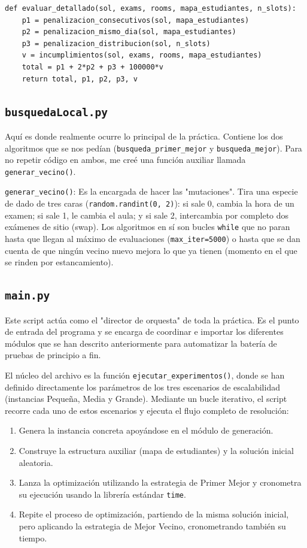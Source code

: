 \documentclass[12pt]{article}
\begin{document}
\begin{lstlisting}[caption={Función de evaluación detallada en Python}]
def evaluar_detallado(sol, exams, rooms, mapa_estudiantes, n_slots):
    p1 = penalizacion_consecutivos(sol, mapa_estudiantes)
    p2 = penalizacion_mismo_dia(sol, mapa_estudiantes)
    p3 = penalizacion_distribucion(sol, n_slots)
    v = incumplimientos(sol, exams, rooms, mapa_estudiantes)
    total = p1 + 2*p2 + p3 + 100000*v
    return total, p1, p2, p3, v
\end{lstlisting}

\subsection{\texttt{busquedaLocal.py}}
Aquí es donde realmente ocurre lo principal de la práctica. Contiene los dos algoritmos que se nos pedían (\texttt{busqueda\_primer\_mejor} y \texttt{busqueda\_mejor}). Para no repetir código en ambos, me creé una función auxiliar llamada \texttt{generar\_vecino()}.

\texttt{generar\_vecino()}: Es la encargada de hacer las "mutaciones". Tira una especie de dado de tres caras (\texttt{random.randint(0, 2)}): si sale 0, cambia la hora de un examen; si sale 1, le cambia el aula; y si sale 2, intercambia por completo dos exámenes de sitio (swap). Los algoritmos en sí son bucles \texttt{while} que no paran hasta que llegan al máximo de evaluaciones (\texttt{max\_iter=5000}) o hasta que se dan cuenta de que ningún vecino nuevo mejora lo que ya tienen (momento en el que se rinden por estancamiento).

\subsection{\texttt{main.py}}
Este script actúa como el "director de orquesta" de toda la práctica. Es el punto de entrada del programa y se encarga de coordinar e importar los diferentes módulos que se han descrito anteriormente para automatizar la batería de pruebas de principio a fin.

El núcleo del archivo es la función \texttt{ejecutar\_experimentos()}, donde se han definido directamente los parámetros de los tres escenarios de escalabilidad (instancias Pequeña, Media y Grande). Mediante un bucle iterativo, el script recorre cada uno de estos escenarios y ejecuta el flujo completo de resolución:
\begin{enumerate}
    \item Genera la instancia concreta apoyándose en el módulo de generación.
    \item Construye la estructura auxiliar (mapa de estudiantes) y la solución inicial aleatoria.
    \item Lanza la optimización utilizando la estrategia de Primer Mejor y cronometra su ejecución usando la librería estándar \texttt{time}.
    \item Repite el proceso de optimización, partiendo de la misma solución inicial, pero aplicando la estrategia de Mejor Vecino, cronometrando también su tiempo.
\end{enumerate}
\end{document}
